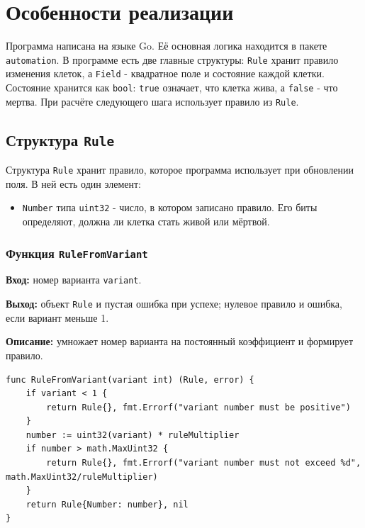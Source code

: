 \section{Особенности реализации}

Программа написана на языке Go. Её основная логика находится в пакете
\texttt{automation}. В программе есть две главные структуры: \texttt{Rule}
хранит правило изменения клеток, а \texttt{Field} - квадратное поле и
состояние каждой клетки. Состояние хранится как \texttt{bool}: \texttt{true}
означает, что клетка жива, а \texttt{false} - что мертва. При расчёте следующего шага использует правило из \texttt{Rule}.
\subsection{Структура \texttt{Rule}}

Структура \texttt{Rule} хранит правило, которое программа использует при
обновлении поля. В ней есть один элемент:

\begin{itemize}
    \item \texttt{Number} типа \texttt{uint32} - число, в котором записано
    правило. Его биты определяют, должна ли клетка стать живой или мёртвой.
\end{itemize}

\subsubsection{Функция \texttt{RuleFromVariant}}

\textbf{Вход:} номер варианта \texttt{variant}.

\textbf{Выход:} объект \texttt{Rule} и пустая ошибка при успехе; нулевое
правило и ошибка, если вариант меньше 1.

\textbf{Описание:} умножает номер варианта на постоянный коэффициент и
формирует правило.

\begin{lstlisting}[style=gostyle,caption={Создание правила по номеру варианта}]
func RuleFromVariant(variant int) (Rule, error) {
    if variant < 1 {
        return Rule{}, fmt.Errorf("variant number must be positive")
    }
    number := uint32(variant) * ruleMultiplier
    if number > math.MaxUint32 {
        return Rule{}, fmt.Errorf("variant number must not exceed %d", math.MaxUint32/ruleMultiplier)
    }
    return Rule{Number: number}, nil
}
\end{lstlisting}

